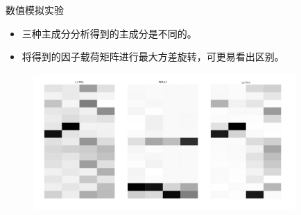 \begin{frame}{数值模拟实验}
    \begin{itemize}
        \item 三种主成分分析得到的主成分是不同的。
        \item 将得到的因子载荷矩阵进行最大方差旋转，可更易看出区别。
    \end{itemize} 
    \begin{figure}
        \includegraphics[width=10cm]{pics/loadings-compare.png}
    \end{figure}

\end{frame}


